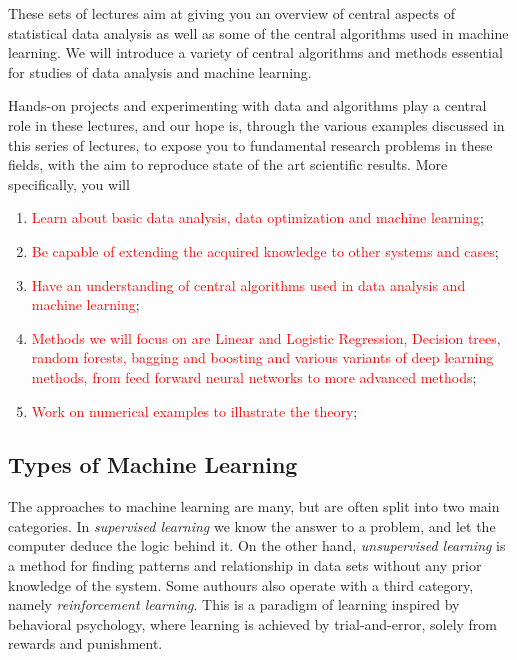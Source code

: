 \documentclass[%
oneside,                 %
final,                   %
10pt]{article}
\begin{document}
These sets of lectures aim at giving you an overview of central aspects of
statistical data analysis as well as some of the central algorithms
used in machine learning.  We will introduce a variety of central
algorithms and methods essential for studies of data analysis and
machine learning. 

Hands-on projects and experimenting with data and algorithms play a central role in
these lectures, and our hope is, through the various examples discussed in this series of lectures,
to  expose you to fundamental
research problems in these fields, with the aim to reproduce state of
the art scientific results. 
More specifically, you will

\begin{enumerate}
\item \textcolor{red}{Learn about basic data analysis, data optimization and machine learning};

\item \textcolor{red}{Be capable of extending the acquired knowledge to other systems and cases};

\item \textcolor{red}{Have an understanding of central algorithms used in data analysis and machine learning};

\item \textcolor{red}{Methods we will focus on are Linear and Logistic Regression, Decision trees, random forests, bagging and boosting and various variants of deep learning methods, from feed forward neural networks to more advanced methods};

\item \textcolor{red}{Work on numerical examples to illustrate the theory}; 
\end{enumerate}

\noindent


\subsection{Types of Machine Learning}


The approaches to machine learning are many, but are often split into
two main categories.  In \emph{supervised learning} we know the answer to a
problem, and let the computer deduce the logic behind it. On the other
hand, \emph{unsupervised learning} is a method for finding patterns and
relationship in data sets without any prior knowledge of the system.
Some authours also operate with a third category, namely
\emph{reinforcement learning}. This is a paradigm of learning inspired by
behavioral psychology, where learning is achieved by trial-and-error,
solely from rewards and punishment.
\end{document}
